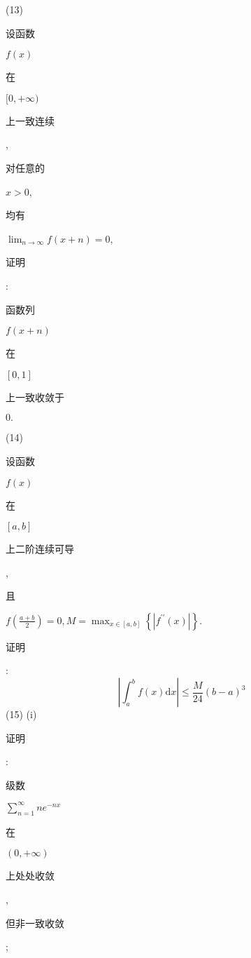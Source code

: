 \documentclass[10pt]{article}
\begin{document}
(13) \begin{CJK}{UTF8}{mj}设函数\end{CJK} $f(x)$ \begin{CJK}{UTF8}{mj}在\end{CJK} $[0,+\infty)$ \begin{CJK}{UTF8}{mj}上一致连续\end{CJK}, \begin{CJK}{UTF8}{mj}对任意的\end{CJK} $x>0$, \begin{CJK}{UTF8}{mj}均有\end{CJK} $\lim _{n \rightarrow \infty} f(x+n)=0$, \begin{CJK}{UTF8}{mj}证明\end{CJK}: \begin{CJK}{UTF8}{mj}函数列\end{CJK} $f(x+n)$ \begin{CJK}{UTF8}{mj}在\end{CJK} $[0,1]$ \begin{CJK}{UTF8}{mj}上一致收敛于\end{CJK} $0 .$

(14) \begin{CJK}{UTF8}{mj}设函数\end{CJK} $f(x)$ \begin{CJK}{UTF8}{mj}在\end{CJK} $[a, b]$ \begin{CJK}{UTF8}{mj}上二阶连续可导\end{CJK}, \begin{CJK}{UTF8}{mj}且\end{CJK} $f\left(\frac{a+b}{2}\right)=0, M=\max _{x \in[a, b]}\left\{\left|f^{\prime \prime}(x)\right|\right\}$. \begin{CJK}{UTF8}{mj}证明\end{CJK}:
$$
\left|\int_{a}^{b} f(x) \mathrm{d} x\right| \leq \frac{M}{24}(b-a)^{3}
$$
(15) (i) \begin{CJK}{UTF8}{mj}证明\end{CJK}: \begin{CJK}{UTF8}{mj}级数\end{CJK} $\sum_{n=1}^{\infty} n e^{-n x}$ \begin{CJK}{UTF8}{mj}在\end{CJK} $(0,+\infty)$ \begin{CJK}{UTF8}{mj}上处处收敛\end{CJK}, \begin{CJK}{UTF8}{mj}但非一致收敛\end{CJK};
\end{document}
